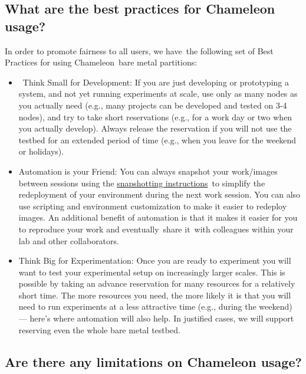 \subsection{What are the best practices for Chameleon
usage?}\label{what-are-the-best-practices-for-chameleon-usage}

In order to promote fairness to all users, we have~the following set of
Best Practices for using Chameleon~bare metal partitions:

\begin{itemize}

\item
  ~Think Small for Development: If you are just developing or
  prototyping a system, and not yet running experiments at scale, use
  only as many nodes as you actually need (e.g., many projects can be
  developed and tested on 3-4 nodes), and try to take short reservations
  (e.g., for a work day or two when you actually develop). Always
  release the reservation if you will not use the testbed for an
  extended period of time (e.g., when you leave for the weekend or
  holidays).~
\item
  Automation is your Friend: You can always snapshot your work/images
  between sessions using the
  \href{https://www.chameleoncloud.org/docs/user-guides/ironic/\#snapshotting_an_instance}{snapshotting
  instructions}~to simplify the redeployment of your environment during
  the next work session. You can also use scripting and environment
  customization to make it easier to redeploy images. An additional
  benefit of automation is that it makes it easier for you to reproduce
  your work and eventually~share it~with colleagues within your lab and
  other collaborators.
\item
  Think Big for Experimentation: Once you are ready to experiment you
  will want to test your experimental setup on increasingly larger
  scales. This is possible by taking an advance reservation for many
  resources for a relatively short time. The more resources you need,
  the more likely it is that you will need to run experiments at a less
  attractive time (e.g., during the weekend) --- here's where automation
  will also help. In justified cases, we will support reserving even the
  whole bare metal testbed.
\end{itemize}

\subsection{Are there any limitations on Chameleon
usage?}\label{are-there-any-limitations-on-chameleon-usage}

